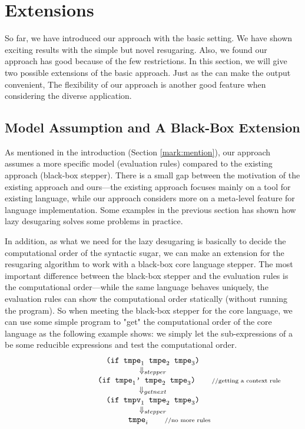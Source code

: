 \section{Extensions}
\label{sec:ext}

So far, we have introduced our approach with the basic setting. We have shown exciting results with the simple but novel resugaring. Also, we found our approach has good because of the few restrictions. In this section, we will give two possible extensions of the basic approach. Just as the  can make the output convenient, The flexibility of our approach is another good feature when considering the diverse application.

\subsection{Model Assumption and A Black-Box Extension}


As mentioned in the introduction (Section \ref{mark:mention}), our approach assumes a more specific model (evaluation rules) compared to the existing approach (black-box stepper). There is a small gap between the motivation of the existing approach and ours---the existing approach focuses mainly on a tool for existing language, while our approach considers more on a meta-level feature for language implementation. Some examples in the previous section has shown how lazy desugaring solves some problems in practice.

In addition, as what we need for the lazy desugaring is basically to decide the computational order of the syntactic sugar, we can make an extension for the resugaring algorithm to work with a black-box core language stepper. The most important difference between the black-box stepper and the evaluation rules is the computational order---while the same language behaves uniquely, the evaluation rules can show the computational order statically (without running the program). So when meeting the black-box stepper for the core language, we can use some simple program to "get" the computational order of the core language as the following example shows: we simply let the sub-expressions of a  be some reducible expressions and test the computational order.
\[
	\begin{array}{c}
		\texttt{(if $\mbox{\tt tmpe}_1$ $\mbox{\tt tmpe}_2$ $\mbox{\tt tmpe}_3$)}\\
		\Downarrow_{stepper}\\
		\qquad\qquad\qquad\qquad\;\;\;\texttt{(if $\mbox{\tt tmpe}_1$' $\mbox{\tt tmpe}_2$ $\mbox{\tt tmpe}_3$)} \qquad\mbox{{\scriptsize //getting a context rule}}\\
		\Downarrow_{getnext}\\ 
		\texttt{(if $\mbox{\tt tmpv}_1$ $\mbox{\tt tmpe}_2$ $\mbox{\tt tmpe}_3$)}\\ 
		\Downarrow_{stepper}\\
		\qquad\qquad\texttt{$\mbox{\tt tmpe}_i$} \qquad\mbox{{\scriptsize //no more rules}}\\
	\end{array}
\]



